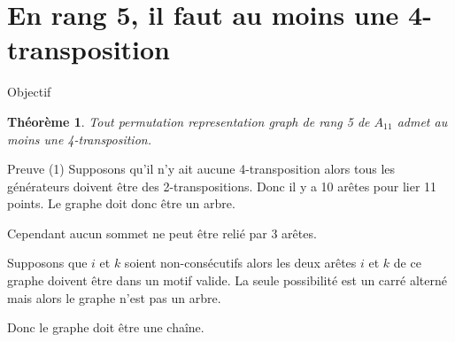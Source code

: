 \documentclass[10pt]{beamer}
\newtheorem{theorem}[definition]{Théorème}
\begin{document}
\section{En rang 5, il faut au moins une 4-transposition}

\begin{frame}{Objectif}
  \begin{theorem}
    Tout permutation representation graph de rang 5 de $A_{11}$ admet au moins une 4-transposition.
  \end{theorem}
\end{frame}

\begin{frame}{Preuve (1)}
    Supposons qu'il n'y ait aucune 4-transposition alors tous les générateurs doivent être des 2-transpositions. Donc il y a 10 arêtes pour lier 11 points. Le graphe doit donc être un arbre.

    Cependant aucun sommet ne peut être relié par 3 arêtes.

    \begin{figure}[H]
      \begin{center}
      \end{center}
    \end{figure}

    Supposons que $i$ et $k$ soient non-consécutifs alors les deux arêtes $i$ et $k$ de ce graphe doivent être dans un motif valide. La seule possibilité est un carré alterné mais alors le graphe n'est pas un arbre.

    Donc le graphe doit être une chaîne.
\end{frame}
\end{document}
